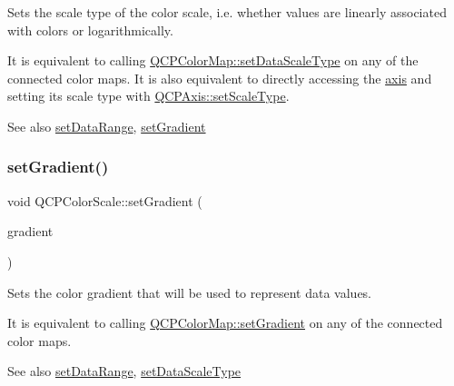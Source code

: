 Sets the scale type of the color scale, i.\+e. whether values are linearly associated with colors or logarithmically.

It is equivalent to calling \mbox{\hyperlink{class_q_c_p_color_map_a9d20aa08e3c1f20f22908c45b9c06511}{Q\+C\+P\+Color\+Map\+::set\+Data\+Scale\+Type}} on any of the connected color maps. It is also equivalent to directly accessing the \mbox{\hyperlink{class_q_c_p_color_scale_a39bdbdb3b212602a5a57f9f3ea444190}{axis}} and setting its scale type with \mbox{\hyperlink{class_q_c_p_axis_adef29cae617af4f519f6c40d1a866ca6}{Q\+C\+P\+Axis\+::set\+Scale\+Type}}.

\begin{DoxySeeAlso}{See also}
\mbox{\hyperlink{class_q_c_p_color_scale_abe88633003a26d1e756aa74984587fef}{set\+Data\+Range}}, \mbox{\hyperlink{class_q_c_p_color_scale_a1f29583bb6f1e7f473b62fb712be3940}{set\+Gradient}} 
\end{DoxySeeAlso}
\mbox{\label{class_q_c_p_color_scale_a1f29583bb6f1e7f473b62fb712be3940}} 
\subsubsection{\texorpdfstring{set\+Gradient()}{setGradient()}}
{\footnotesize\ttfamily void Q\+C\+P\+Color\+Scale\+::set\+Gradient (\begin{DoxyParamCaption}\item[{const \mbox{\hyperlink{class_q_c_p_color_gradient}{Q\+C\+P\+Color\+Gradient}} \&}]{gradient }\end{DoxyParamCaption})}

Sets the color gradient that will be used to represent data values.

It is equivalent to calling \mbox{\hyperlink{class_q_c_p_color_map_a7313c78360471cead3576341a2c50377}{Q\+C\+P\+Color\+Map\+::set\+Gradient}} on any of the connected color maps.

\begin{DoxySeeAlso}{See also}
\mbox{\hyperlink{class_q_c_p_color_scale_abe88633003a26d1e756aa74984587fef}{set\+Data\+Range}}, \mbox{\hyperlink{class_q_c_p_color_scale_aeb6107d67dd7325145b2498abae67fc3}{set\+Data\+Scale\+Type}} 
\end{DoxySeeAlso}
\mbox{\label{class_q_c_p_color_scale_aee124ae8396320cacf8276e9a0fbb8ce}} 

